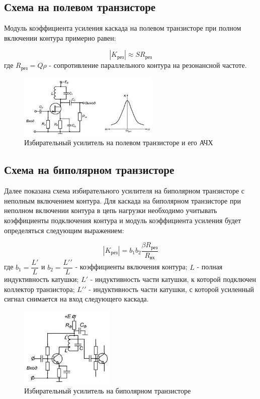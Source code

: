 \documentclass[unicode, 12pt, a4paper, oneside]{article}
\begin{document}
\subsection*{Схема на полевом транзисторе}

Модуль коэффициента усиления каскада на полевом транзисторе при полном включении контура примерно равен:

\begin{equation}
|K_\text{рез}| \approx S R_\text{рез}
\end{equation}
где $ R_\text{рез} = Q\rho $ - сопротивление параллельного контура на резонансной частоте.

\begin{figure}[H]
\centering
\includegraphics[width=0.6\textwidth]{7_field_based_amp.jpg}
\caption{Избирательный усилитель на полевом транзисторе и его АЧХ}
\label{fig:7_field_based_amp}
\end{figure}

\subsection*{Схема на биполярном транзисторе}

Далее показана схема избирательного усилителя на биполярном транзисторе с неполным включением контура. Для каскада на биполярном транзисторе при неполном включении контура в цепь нагрузки необходимо учитывать коэффициенты подключения контура и модуль коэффициента усиления будет определяться следующим выражением:

\begin{equation}
|K_\text{рез}| = b_{1}b_{2} \dfrac{\beta R_\text{рез}}{R_\text{вх}}
\end{equation}
где $ b_{1} = \dfrac{L\prime}{L} $ и $ b_{2} = \dfrac{L\prime\prime}{L} $ - коэффициенты включения контура; $L$ - полная индуктивность катушки; $L\prime$ - индуктивность части катушки, к которой подключен коллектор транзистора; $L\prime\prime$ - индуктивность части катушки, с которой усиленный сигнал снимается на вход следующего каскада.

\begin{figure}[H]
\centering
\includegraphics[width=0.4\textwidth]{7_bipolar_based_amp.jpg}
\caption{Избирательный усилитель на биполярном транзисторе}
\label{fig:7_bipolar_based_amp}
\end{figure}
\end{document}
